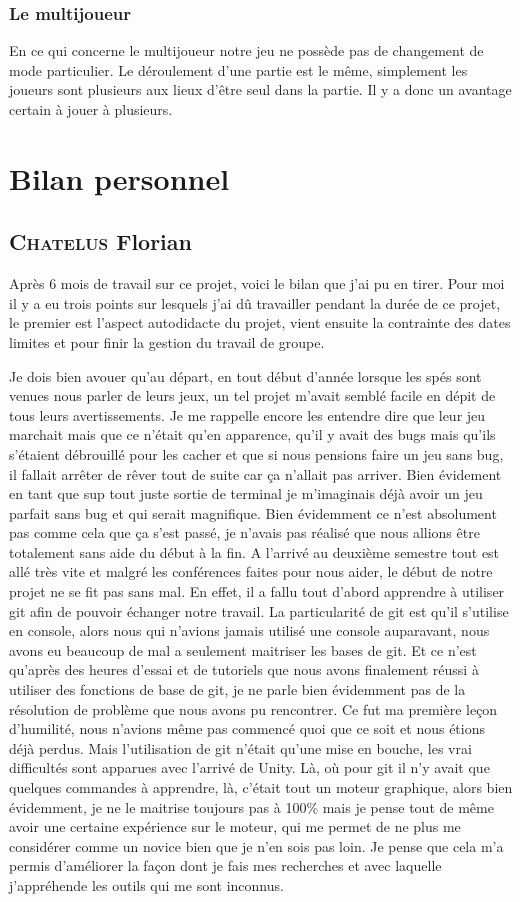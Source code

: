 \documentclass[a4paper, 12pt]{article}
\begin{document}
			\subsubsection{Le multijoueur}
			En ce qui concerne le multijoueur notre jeu ne possède pas de changement de mode particulier. Le déroulement d’une partie est le même, simplement les joueurs sont plusieurs aux lieux d’être seul dans la partie. Il y a donc un avantage certain à jouer à plusieurs.
				
			
\section{Bilan personnel}
	\subsection{\textsc{Chatelus} Florian}
	Après 6 mois de travail sur ce projet, voici le bilan que j’ai pu en tirer. Pour moi il y a eu trois points sur lesquels j’ai dû travailler pendant la durée de ce projet, le premier est l’aspect autodidacte du projet, vient ensuite la contrainte des dates limites et pour finir la gestion du travail de groupe.
		\medbreak
\par Je dois bien avouer qu’au départ, en tout début d’année lorsque les spés sont venues nous parler de leurs jeux, un tel projet m’avait semblé facile en dépit de tous leurs avertissements. Je me rappelle encore les entendre dire que leur jeu marchait mais que ce n’était qu’en apparence, qu’il y avait des bugs mais qu’ils s’étaient débrouillé pour les cacher et que si nous pensions faire un jeu sans bug, il fallait arrêter de rêver tout de suite car ça n’allait pas arriver. Bien évidement en tant que sup tout juste sortie de terminal je m’imaginais déjà avoir un jeu parfait sans bug et qui serait magnifique. Bien évidemment ce n’est absolument pas comme cela que ça s’est passé, je n’avais pas réalisé que nous allions être totalement sans aide du début à la fin. A l’arrivé au deuxième semestre tout est allé très vite et malgré les conférences faites pour nous aider, le début de notre projet ne se fit pas sans mal. En effet, il a fallu tout d’abord apprendre à utiliser git afin de pouvoir échanger notre travail. La particularité de git est qu’il s’utilise en console, alors nous qui n’avions jamais utilisé une console auparavant, nous avons eu beaucoup de mal a seulement maitriser les bases de git. Et ce n’est qu’après des heures d’essai et de tutoriels que nous avons finalement réussi à utiliser des fonctions de base de git, je ne parle bien évidemment pas de la résolution de problème que nous avons pu rencontrer. Ce fut ma première leçon d’humilité, nous n’avions même pas commencé quoi que ce soit et nous étions déjà perdus. Mais l’utilisation de git n’était qu’une mise en bouche, les vrai difficultés sont apparues avec l’arrivé de Unity. Là, o\`u pour git il n’y avait que quelques commandes à apprendre, là, c’était tout un moteur graphique, alors bien évidemment, je ne le maitrise toujours pas à 100\%  mais je pense tout de même avoir une certaine expérience sur le moteur, qui me permet de ne plus me considérer comme un novice bien que je n’en sois pas loin. Je pense que cela m’a permis d’améliorer la façon dont je fais mes recherches et avec laquelle j’appréhende les outils qui me sont inconnus.
\end{document}
